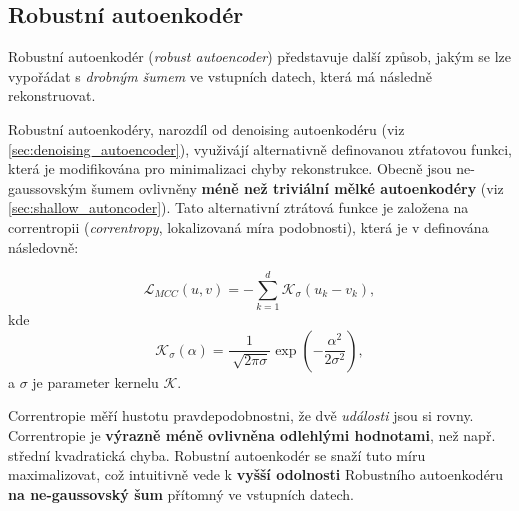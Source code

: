 \subsection{Robustní autoenkodér}
\label{sec:robust_ae}
Robustní autoenkodér (\emph{robust autoencoder}) představuje další způsob, jakým se lze vypořádat s \emph{drobným šumem} ve vstupních datech, která má následně rekonstruovat.


Robustní autoenkodéry, narozdíl od denoising autoenkodéru (viz \autoref{sec:denoising_autoencoder}), využivájí alternativně definovanou ztŕatovou funkci, která je modifikována pro minimalizaci chyby rekonstrukce.
Obecně jsou ne-gaussovským šumem ovlivněny \textbf{méně než triviální mělké autoenkodéry} (viz \autoref{sec:shallow_autoncoder}).
Tato alternativní ztrátová funkce je založena na correntropii (\emph{correntropy}, lokalizovaná míra podobnosti), která je v \cite{Liu2006} definována následovně:

\begin{equation}
    \mathcal{L}_{MCC}(u, v) = -\sum_{k=1}^{d} \mathcal{K}_\sigma(u_k - v_k),
\end{equation}
kde
\begin{equation}
    \mathcal{K}_\sigma(\alpha) = \frac{1}{\sqrt[]{2\pi\sigma}}\exp(-\frac{\alpha^2}{2\sigma^2}),
\end{equation}
a $\sigma$ je parameter kernelu $\mathcal{K}$.

Correntropie měří hustotu pravdepodobnostni, že dvě \emph{události} jsou si rovny.
Correntropie je \textbf{výrazně méně ovlivněna odlehlými hodnotami}, než např. střední kvadratická chyba. \cite{Liu2006}
Robustní autoenkodér se snaží tuto míru maximalizovat, což intuitivně vede k \textbf{vyšší odolnosti} Robustního autoenkodéru \textbf{na ne-gaussovský šum} přítomný ve vstupních datech. \cite{Charte2018}
